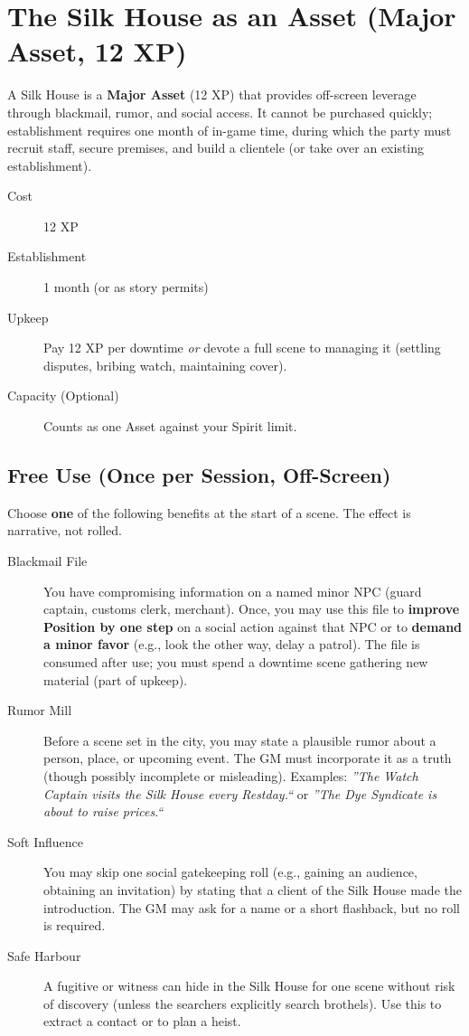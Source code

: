 \documentclass[10pt,twoside]{book}
\begin{document}
\section{The Silk House as an Asset (Major Asset, 12 XP)}

A Silk House is a \textbf{Major Asset} (12 XP) that provides off-screen leverage through blackmail, rumor, and social access. It cannot be purchased quickly; establishment requires one month of in-game time, during which the party must recruit staff, secure premises, and build a clientele (or take over an existing establishment).

\begin{description}
  \item[Cost] 12 XP
  \item[Establishment] 1 month (or as story permits)
  \item[Upkeep] Pay 12 XP per downtime \emph{or} devote a full scene to managing it (settling disputes, bribing watch, maintaining cover).
  \item[Capacity (Optional)] Counts as one Asset against your Spirit limit.
\end{description}

\subsection{Free Use (Once per Session, Off-Screen)}

Choose \textbf{one} of the following benefits at the start of a scene. The effect is narrative, not rolled.

\begin{description}
  \item[Blackmail File] You have compromising information on a named minor NPC (guard captain, customs clerk, merchant). Once, you may use this file to \textbf{improve Position by one step} on a social action against that NPC or to \textbf{demand a minor favor} (e.g., look the other way, delay a patrol). The file is consumed after use; you must spend a downtime scene gathering new material (part of upkeep).

  \item[Rumor Mill] Before a scene set in the city, you may state a plausible rumor about a person, place, or upcoming event. The GM must incorporate it as a truth (though possibly incomplete or misleading). Examples: \textit{''The Watch Captain visits the Silk House every Restday.``} or \textit{''The Dye Syndicate is about to raise prices.``}

  \item[Soft Influence] You may skip one social gatekeeping roll (e.g., gaining an audience, obtaining an invitation) by stating that a client of the Silk House made the introduction. The GM may ask for a name or a short flashback, but no roll is required.

  \item[Safe Harbour] A fugitive or witness can hide in the Silk House for one scene without risk of discovery (unless the searchers explicitly search brothels). Use this to extract a contact or to plan a heist.
\end{description}
\end{document}
